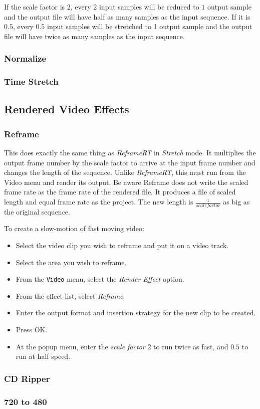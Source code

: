 If the scale factor is $2$, every $2$ input samples will be reduced to $1$ output sample and the output file will have half as many samples as the input sequence. If it is $0.5$, every $0.5$ input samples will be stretched to 1 output sample and the output file will have twice as many samples as the input sequence.

\subsubsection*{Normalize}%
\label{ssub:normalize}

\subsubsection*{Time Stretch}%
\label{ssub:time_stretch}

\subsection{Rendered Video Effects}%
\label{sub:renederd_video_effets}

\subsubsection*{Reframe}%
\label{ssub:reframe}

This does exactly the same thing as \textit{ReframeRT} in \textit{Stretch} mode. It multiplies the output frame number by the scale factor to arrive at the input frame number and changes the length of the sequence. Unlike \textit{ReframeRT}, this must run from the Video menu and render its output. Be aware Reframe does not write the scaled frame rate as the frame rate of the rendered file. It produces a file of scaled length and equal frame rate as the project. The new length is $\frac{1}{scale factor}$ as big as the original sequence.

To create a slow-motion of fast moving video:

\begin{itemize}
    \item Select the video clip you wish to reframe and put it on a video track.
    \item Select the area you wish to reframe.
    \item From the \texttt{Video} menu, select the \textit{Render Effect} option.
    \item From the effect list, select \textit{Reframe}.
    \item Enter the output format and insertion strategy for the new clip to be created.
    \item Press OK.
    \item At the popup menu, enter the \textit{scale factor} $2$ to run twice as fast, and $0.5$ to run at half speed.
\end{itemize}

\subsubsection*{CD Ripper}%
\label{ssub:cd_ripper}

\subsubsection*{720 to 480}%
\label{ssub:720_to_480}


